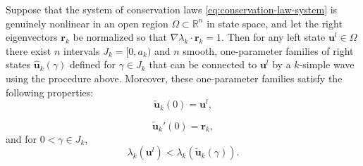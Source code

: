 \begin{Theorem}
\label{thm:rarefaction-curves-existence}
Suppose that the system of conservation laws \eqref{eq:conservation-law-system} is genuinely nonlinear in an open region $\Omega\subset\mathbb{R}^n$ in state space, and let the right eigenvectors $\bm{r}_k$ be normalized so that $\nabla\lambda_k\cdot\bm{r}_k=1$. Then for any left state $\bm{u}^l\in\Omega$ there exist $n$ intervals $J_k=[0,a_k)$ and $n$ smooth, one-parameter families of right states $\hat{\bm{u}}_k(\gamma)$ defined for $\gamma\in J_k$ that can be connected to $\bm{u}^l$ by a $k$-simple wave using the procedure above. Moreover, these one-parameter families satisfy the following properties:
\begin{equation}\label{eq:rarefaction-curve-base-state}
\tilde{\bm{u}}_k(0)=\bm{u}^l,
\end{equation}

\begin{equation}\label{eq:rarefaction-curve-initial-tangent}
\tilde{\bm{u}}_k'(0)=\bm{r}_k,
\end{equation}
and for $0<\gamma\in J_k$,
\begin{equation}\label{eq:rarefaction-curve-increasing-speed}
\lambda_k(\bm{u}^l)<\lambda_k(\tilde{\bm{u}}_k(\gamma)).
\end{equation}

\end{Theorem}

